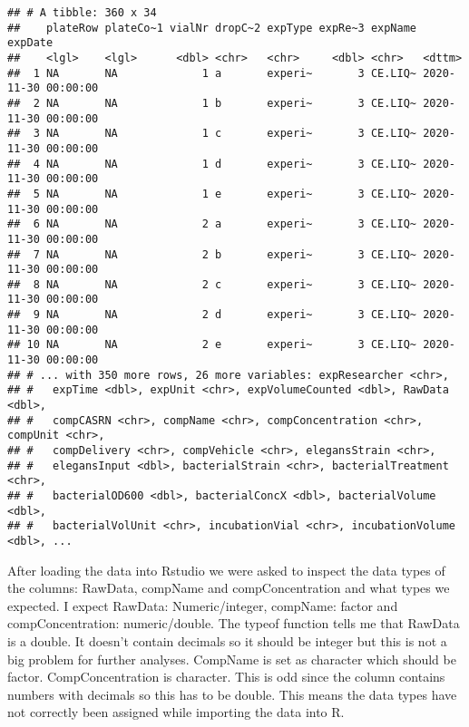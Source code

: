 \documentclass[
]{book}
\newenvironment{Shaded}{\begin{snugshade}}{\end{snugshade}}
\newcommand{\FunctionTok}[1]{\textcolor[rgb]{0.00,0.00,0.00}{#1}}
\newcommand{\NormalTok}[1]{#1}
\newcommand{\SpecialCharTok}[1]{\textcolor[rgb]{0.00,0.00,0.00}{#1}}
\begin{document}
\begin{verbatim}
## # A tibble: 360 x 34
##    plateRow plateCo~1 vialNr dropC~2 expType expRe~3 expName expDate            
##    <lgl>    <lgl>      <dbl> <chr>   <chr>     <dbl> <chr>   <dttm>             
##  1 NA       NA             1 a       experi~       3 CE.LIQ~ 2020-11-30 00:00:00
##  2 NA       NA             1 b       experi~       3 CE.LIQ~ 2020-11-30 00:00:00
##  3 NA       NA             1 c       experi~       3 CE.LIQ~ 2020-11-30 00:00:00
##  4 NA       NA             1 d       experi~       3 CE.LIQ~ 2020-11-30 00:00:00
##  5 NA       NA             1 e       experi~       3 CE.LIQ~ 2020-11-30 00:00:00
##  6 NA       NA             2 a       experi~       3 CE.LIQ~ 2020-11-30 00:00:00
##  7 NA       NA             2 b       experi~       3 CE.LIQ~ 2020-11-30 00:00:00
##  8 NA       NA             2 c       experi~       3 CE.LIQ~ 2020-11-30 00:00:00
##  9 NA       NA             2 d       experi~       3 CE.LIQ~ 2020-11-30 00:00:00
## 10 NA       NA             2 e       experi~       3 CE.LIQ~ 2020-11-30 00:00:00
## # ... with 350 more rows, 26 more variables: expResearcher <chr>,
## #   expTime <dbl>, expUnit <chr>, expVolumeCounted <dbl>, RawData <dbl>,
## #   compCASRN <chr>, compName <chr>, compConcentration <chr>, compUnit <chr>,
## #   compDelivery <chr>, compVehicle <chr>, elegansStrain <chr>,
## #   elegansInput <dbl>, bacterialStrain <chr>, bacterialTreatment <chr>,
## #   bacterialOD600 <dbl>, bacterialConcX <dbl>, bacterialVolume <dbl>,
## #   bacterialVolUnit <chr>, incubationVial <chr>, incubationVolume <dbl>, ...
\end{verbatim}

After loading the data into Rstudio we were asked to inspect the data types of the columns: RawData, compName and compConcentration and what types we expected.
I expect RawData: Numeric/integer, compName: factor and compConcentration: numeric/double.
The typeof function tells me that RawData is a double. It doesn't contain decimals so it should be integer but this is not a big problem for further analyses. CompName is set as character which should be factor. CompConcentration is character. This is odd since the column contains numbers with decimals so this has to be double.
This means the data types have not correctly been assigned while importing the data into R.

\begin{Shaded}
\end{Shaded}
\end{document}
